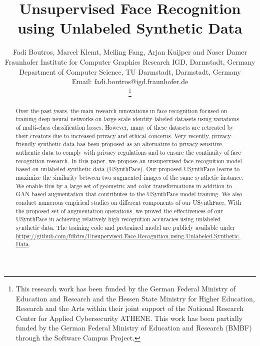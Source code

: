 \documentclass[10pt,twocolumn,letterpaper]{ieeeconf}
\title{\LARGE \bf
Unsupervised Face Recognition using Unlabeled Synthetic Data 
}
\author{\parbox{16cm}{\centering
    {\large Fadi Boutros, Marcel Klemt, Meiling Fang, Arjan Kuijper and Naser Damer}\\
    {\normalsize
    Fraunhofer Institute for Computer Graphics Research IGD,
Darmstadt, Germany\\
Department of Computer Science, TU Darmstadt,
Darmstadt, Germany\\
 Email: {fadi.boutros@igd.fraunhofer.de}
 }}
    \thanks{This research work has been funded by the German Federal Ministry of Education and Research and the Hessen State Ministry for Higher Education, Research and the Arts within their joint support of the National Research Center for Applied Cybersecurity ATHENE. This work has been partially funded by the German Federal Ministry of Education and Research (BMBF) through the Software Campus Project.}}
\begin{document}
\maketitle


\begin{abstract}
Over the past years, the main research innovations in face recognition focused on training deep neural networks on large-scale identity-labeled datasets using variations of multi-class classification losses. However, many of these datasets are retreated by their creators due to increased privacy and ethical concerns. Very recently, privacy-friendly synthetic data has been proposed as an alternative to privacy-sensitive authentic data to comply with privacy regulations and to ensure the continuity of face recognition research. In this paper, we propose an unsupervised face recognition model based on unlabeled synthetic data (USynthFace). 
Our proposed USynthFace learns to maximize the similarity between two augmented images of the same synthetic instance.  
We enable this by a large set of geometric and color transformations in addition to GAN-based augmentation that contributes to the USynthFace model training. 
We also conduct numerous empirical studies on different components of our USynthFace. With the proposed set of augmentation operations, we proved the effectiveness of our USynthFace in achieving relatively high recognition accuracies using unlabeled synthetic data. The training code and pretrained model are publicly available under \url{https://github.com/fdbtrs/Unsupervised-Face-Recognition-using-Unlabeled-Synthetic-Data}.


\end{abstract}
\end{document}
